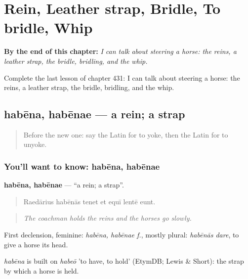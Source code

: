 
\chapter{Rein, Leather strap, Bridle, To bridle, Whip}
\label{ch:la-rein-leather-strap-bridle-to-bridle-whip}

\begin{chapteropening}
\textbf{By the end of this chapter:} \emph{I can talk about steering a horse: the reins, a leather strap, the bridle, bridling, and the whip.}

Complete the last lesson of chapter 431: I can talk about steering a horse: the reins, a leather strap, the bridle, bridling, and the whip.
\end{chapteropening}

\section[habēna, habēnae]{habēna, habēnae — a rein; a strap}

\label{lesson:LA-C431-habena}



\begin{quote}
Before the new one: say the Latin for to yoke, then the Latin for to unyoke.
\end{quote}

\subsection*{You'll want to know: habēna, habēnae}
\textbf{habēna, habēnae} — \textquotedblleft{}a rein; a strap\textquotedblright{}.

\begin{quote}
Raedārius habēnās tenet et equī lentē eunt.
\end{quote}

\begin{quote}
\emph{The coachman holds the reins and the horses go slowly.}
\end{quote}

First declension, feminine: \emph{habēna, habēnae f.}, mostly plural: \emph{habēnās dare}, to give a horse its head.

\begin{cousinweb}
\emph{habēna} is built on \emph{habeō} 'to have, to hold' (EtymDB; Lewis \& Short): the strap by which a horse is held.
\end{cousinweb}

